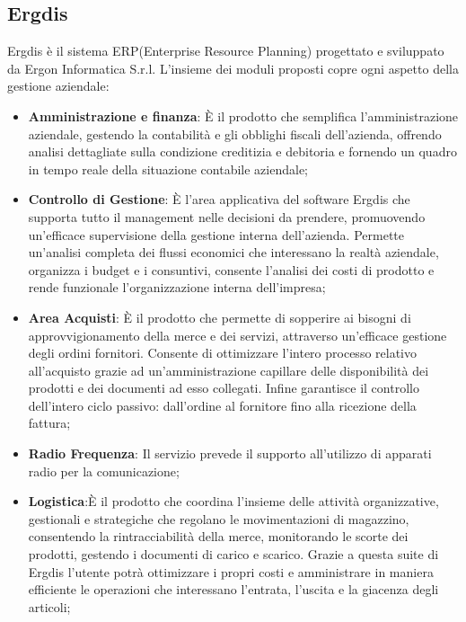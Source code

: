 \pagebreak
\subsection{Ergdis}

Ergdis è il sistema ERP\glosp (Enterprise Resource Planning) progettato e sviluppato da Ergon Informatica S.r.l.
L'insieme dei moduli proposti copre ogni aspetto della gestione aziendale:

\begin{itemize}
	\item \textbf{Amministrazione e finanza}: È il prodotto che semplifica l’amministrazione aziendale, gestendo la contabilità e gli obblighi fiscali dell’azienda,
	 offrendo analisi dettagliate sulla condizione creditizia e debitoria e fornendo un quadro in tempo reale della situazione contabile aziendale;
	
	\item \textbf{Controllo di Gestione}: È l’area applicativa del software Ergdis che supporta tutto il management nelle decisioni da prendere,
	 promuovendo un’efficace supervisione della gestione interna dell’azienda. Permette un’analisi completa dei flussi economici che interessano la realtà aziendale,
	  organizza i budget e i consuntivi, consente l’analisi dei costi di prodotto e rende funzionale l’organizzazione interna dell’impresa;
	
	\item \textbf{Area Acquisti}: È il prodotto che permette di sopperire ai bisogni di approvvigionamento della merce e dei servizi, 
	attraverso un’efficace gestione degli ordini fornitori. Consente di ottimizzare l'intero processo relativo all’acquisto grazie ad un’amministrazione capillare 
	delle disponibilità dei prodotti e dei documenti ad esso collegati. Infine garantisce il controllo dell’intero ciclo passivo: dall’ordine al fornitore fino alla
	ricezione della fattura;
	
	\item \textbf{Radio Frequenza}: Il servizio prevede il supporto all'utilizzo di apparati radio per la comunicazione;
	
	\item \textbf{Logistica}:È il prodotto che coordina l’insieme delle attività organizzative, gestionali e strategiche che regolano le movimentazioni di magazzino, 
	consentendo la rintracciabilità della merce, monitorando le scorte dei prodotti, gestendo i documenti di carico e scarico. Grazie a questa suite di Ergdis l’utente 
	potrà ottimizzare i propri costi e amministrare in maniera efficiente le operazioni che interessano l’entrata, l’uscita e la giacenza degli articoli;
	

\end{itemize}
